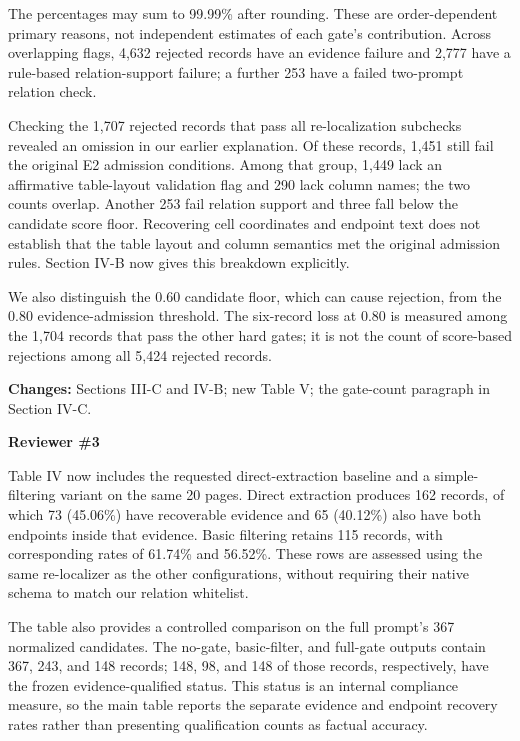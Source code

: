 The percentages may sum to 99.99\% after rounding. These are order-dependent primary reasons, not independent estimates of each gate's contribution. Across overlapping flags, 4,632 rejected records have an evidence failure and 2,777 have a rule-based relation-support failure; a further 253 have a failed two-prompt relation check.

Checking the 1,707 rejected records that pass all re-localization subchecks revealed an omission in our earlier explanation. Of these records, 1,451 still fail the original E2 admission conditions. Among that group, 1,449 lack an affirmative table-layout validation flag and 290 lack column names; the two counts overlap. Another 253 fail relation support and three fall below the candidate score floor. Recovering cell coordinates and endpoint text does not establish that the table layout and column semantics met the original admission rules. Section IV-B now gives this breakdown explicitly.

We also distinguish the 0.60 candidate floor, which can cause rejection, from the 0.80 evidence-admission threshold. The six-record loss at 0.80 is measured among the 1,704 records that pass the other hard gates; it is not the count of score-based rejections among all 5,424 rejected records.

\textbf{Changes:} Sections III-C and IV-B; new Table V; the gate-count paragraph in Section IV-C.

\clearpage
{\large\bfseries Reviewer \#3}


Table IV now includes the requested direct-extraction baseline and a simple-filtering variant on the same 20 pages. Direct extraction produces 162 records, of which 73 (45.06\%) have recoverable evidence and 65 (40.12\%) also have both endpoints inside that evidence. Basic filtering retains 115 records, with corresponding rates of 61.74\% and 56.52\%. These rows are assessed using the same re-localizer as the other configurations, without requiring their native schema to match our relation whitelist.

The table also provides a controlled comparison on the full prompt's 367 normalized candidates. The no-gate, basic-filter, and full-gate outputs contain 367, 243, and 148 records; 148, 98, and 148 of those records, respectively, have the frozen evidence-qualified status. This status is an internal compliance measure, so the main table reports the separate evidence and endpoint recovery rates rather than presenting qualification counts as factual accuracy.

